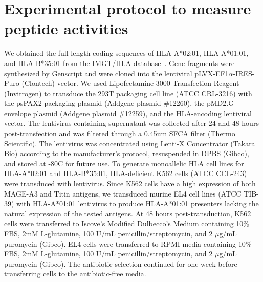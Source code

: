 \section{Experimental protocol to measure peptide activities}
 We obtained the full-length coding
sequences of HLA-A*02:01, HLA-A*01:01, and HLA-B*35:01 from the IMGT/HLA
database~\cite{Robinson2003-ru}. Gene fragments were synthesized by Genscript and were cloned into
the lentiviral pLVX-EF1$\alpha$-IRES-Puro (Clontech) vector. We used Lipofectamine 3000 Transfection
Reagent (Invitrogen) to transduce the 293T packaging cell line (ATCC CRL-3216) with the psPAX2
packaging plasmid (Addgene plasmid \#12260), the pMD2.G envelope plasmid (Addgene plasmid \#12259),
and the HLA-encoding lentiviral vector. The lentivirus-containing supernatant was collected after 24
and 48 hours post-transfection and was filtered through a 0.45um SFCA filter (Thermo Scientific).
The lentivirus was concentrated using Lenti-X Concentrator (Takara Bio) according to the
manufacturer’s protocol, resuspended in DPBS (Gibco), and stored at -80C for future use. To generate
monoallelic HLA cell lines for HLA-A*02:01 and HLA-B*35:01, HLA-deficient K562 cells (ATCC CCL-243)
were transduced with lentivirus. Since K562 cells have a high expression of both MAGE-A3 and Titin
antigens, we transduced murine EL4 cell lines (ATCC TIB-39) with HLA-A*01:01 lentivirus to produce
HLA-A*01:01 presenters lacking the natural expression of the tested antigens. At 48 hours
post-transduction, K562 cells were transferred to Iscove’s Modified Dulbecco’s Medium containing
10\% FBS, 2mM L-glutamine, 100 U/mL penicillin/streptomycin, and 2 $\mu$g/mL puromycin (Gibco). EL4
cells were transferred to RPMI media containing 10\% FBS, 2mM L-glutamine, 100 U/mL
penicillin/streptomycin, and 2 $\mu$g/mL puromycin (Gibco). The antibiotic selection continued for
one week before transferring cells to the antibiotic-free media.\\

